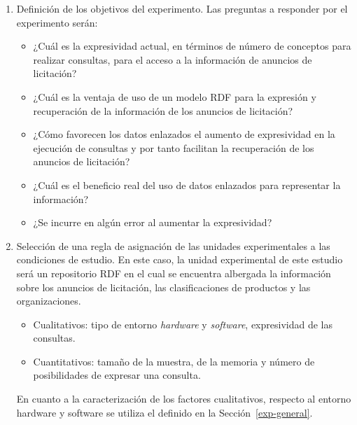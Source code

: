 \begin{enumerate}
 \item Definición de los objetivos del experimento. Las preguntas a responder por el experimento serán:
\begin{itemize}
 \item ¿Cuál es la expresividad actual, en términos de número de conceptos para realizar consultas, para el acceso a la información de anuncios de licitación?
 \item ¿Cuál es la ventaja de uso de un modelo \gls{RDF} para la expresión y recuperación de la información de los anuncios de licitación?
 \item ¿Cómo favorecen los datos enlazados el aumento de expresividad en la ejecución de consultas y por tanto facilitan la recuperación de los 
anuncios de licitación? 
 \item ¿Cuál es el beneficio real del uso de datos enlazados para representar la información? 
 \item ¿Se incurre en algún error al aumentar la expresividad?
\end{itemize}

\item Selección de una regla de asignación de las unidades experimentales a las condiciones de estudio. En este caso, 
la unidad experimental de este estudio será un repositorio RDF en el cual se encuentra albergada la información 
sobre los anuncios de licitación, las clasificaciones de productos y las organizaciones.
\begin{itemize}
 \item Cualitativos: tipo de entorno \textit{hardware} y \textit{software}, expresividad de las consultas.
 \item Cuantitativos: tamaño de la muestra, de la memoria y número de posibilidades de expresar una consulta.
\end{itemize}

En cuanto a la caracterización de los factores cualitativos, respecto al entorno hardware y 
software se utiliza el definido en la Sección~\ref{exp-general}. 


\end{enumerate}
